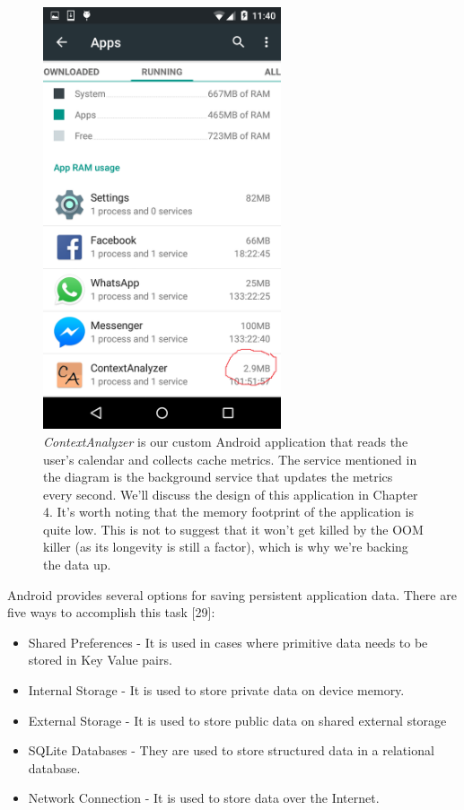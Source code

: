 \documentclass[12pt]{uthesis-v12}  %
\begin{document}
			\begin{figure}[h]
				\centering
				\includegraphics[width = 70mm]{images/lowMemory.png}
				\caption[Memory Occupied by the Background Service]{{\em ContextAnalyzer} is our custom Android application that reads the user's calendar and collects cache metrics. The service mentioned in the diagram is the background service that updates the metrics every second. We'll discuss the design of this application in Chapter 4. It's worth noting that the memory footprint of the application is quite low. This is not to suggest that it won't get killed by the OOM killer (as its longevity is still a factor), which is why we're backing the data up.}
			\end{figure} 

			Android provides several options for saving persistent application data. There are five ways to accomplish this task [29]:
			
			\begin{itemize}
				\item Shared Preferences - It is used in cases where primitive data needs to be stored in Key Value pairs.
				\item Internal Storage - It is used to store private data on device memory.
				\item External Storage - It is used to store public data on shared external storage
				\item SQLite Databases - They are used to store structured data in a relational database.
				\item Network Connection - It is used to store data over the Internet.
			\end{itemize}
			
\end{document}
